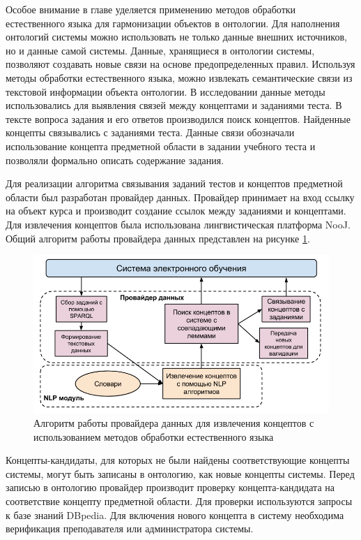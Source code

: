 Особое внимание в главе уделяется применению методов обработки естественного языка для гармонизации объектов в онтологии. Для наполнения онтологий системы можно использовать не только данные внешних источников, но и данные самой системы. Данные, хранящиеся в онтологии системы, позволяют создавать новые связи на основе предопределенных правил. Используя методы обработки естественного языка, можно извлекать семантические связи из текстовой информации объекта онтологии. В исследовании данные методы использовались для выявления связей между концептами и заданиями теста. В тексте вопроса задания и его ответов производился поиск концептов. Найденные концепты связывались с заданиями теста. Данные связи обозначали использование концепта предметной области в задании учебного теста и позволяли формально описать содержание задания. 

Для реализации алгоритма связывания заданий тестов и концептов предметной области был разработан провайдер данных. Провайдер принимает на вход ссылку на объект курса и производит создание ссылок между заданиями и концептами. Для извлечения концептов была использована лингвистическая платформа NooJ. Общий алгоритм работы провайдера данных представлен на рисунке \ref{fig:NLPAlgo}.

\begin{figure}[ht] 
  \center
  \includegraphics[scale=0.45]{NLPAlgo}
  \caption{Алгоритм работы провайдера данных для извлечения концептов с использованием методов обработки естественного языка} 
  \label{fig:NLPAlgo}
\end{figure}

Концепты-кандидаты, для которых не были найдены соответствующие концепты системы, могут быть записаны в онтологию, как новые концепты системы. Перед записью в онтологию провайдер производит проверку концепта-кандидата на соответствие концепту предметной области. Для проверки используются запросы к базе знаний DBpedia. Для включения нового концепта в систему необходима верификация преподавателя или администратора системы. 


